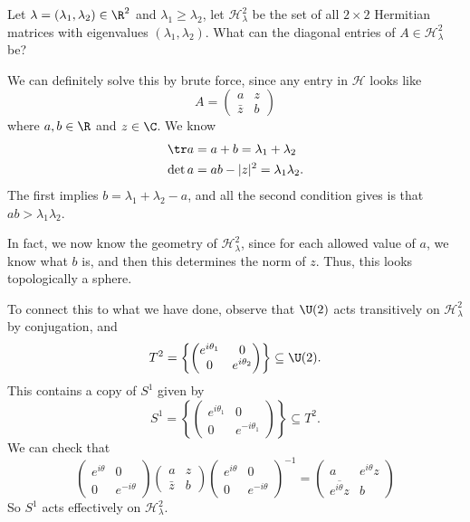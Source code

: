\documentclass[a4paper]{article}
\begin{document}
\begin{eg}
  Let $\lambda = (\lambda_1, \lambda_2) \in \R^2$ and $\lambda_1 \geq \lambda_2$, let $\mathcal{H}^2_\lambda$ be the set of all $2 \times 2$ Hermitian matrices with eigenvalues $(\lambda_1, \lambda_2)$. What can the diagonal entries of $A \in \mathcal{H}^2_\lambda$ be?

  We can definitely solve this by brute force, since any entry in $\mathcal{H}$ looks like
  \[
    A =
    \begin{pmatrix}
      a & z\\
      \bar{z} & b
    \end{pmatrix}
  \]
  where $a, b \in \R$ and $z \in \C$. We know
  \begin{align*}
    \tr a &= a + b = \lambda_1 + \lambda_2\\
    \det a &= ab - |z|^2 = \lambda_1 \lambda_2.
  \end{align*}
  The first implies $b = \lambda_1 + \lambda_2 - a$, and all the second condition gives is that $ab > \lambda_1 \lambda_2$.

  In fact, we now know the geometry of $\mathcal{H}^2_\lambda$, since for each allowed value of $a$, we know what $b$ is, and then this determines the norm of $z$. Thus, this looks topologically a sphere.

  To connect this to what we have done, observe that $\U(2)$ acts transitively on $\mathcal{H}_\lambda^2$ by conjugation, and
  \[
    T^2 = \left\{
      \begin{pmatrix}
        e^{i\theta_1} & 0\\
        0 & e^{i\theta_2}
    \end{pmatrix}\right\} \subseteq \U(2).
  \]
  This contains a copy of $S^1$ given by
  \[
    S^1 = \left\{
      \begin{pmatrix}
        e^{i\theta_1} & 0\\
        0 & e^{-i\theta_1}
    \end{pmatrix}\right\} \subseteq T^2.
  \]
  We can check that
  \[
    \begin{pmatrix}
      e^{i\theta} & 0\\
      0 & e^{-i\theta}
    \end{pmatrix}
    \begin{pmatrix}
      a & z\\
      \bar{z} & b
    \end{pmatrix}
    \begin{pmatrix}
      e^{i\theta} & 0\\
      0 & e^{-i\theta}
    \end{pmatrix}^{-1} =
    \begin{pmatrix}
      a & e^{i\theta}z\\
      \overline{e^{i\theta} z} & b
    \end{pmatrix}
  \]
  So $S^1$ acts effectively on $\mathcal{H}_\lambda^2$.


\end{eg}
\end{document}
